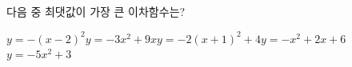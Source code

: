 \hspace*{2mm}\begin{minipage}[t]{\dimexpr\linewidth-2mm\relax}\vspace{0pt}
다음 중 최댓값이 가장 큰 이차함수는?
\begin{choicesii}{$y=-(x-2)^2$}{$y=-3x^2+9x$}{$y=-2(x+1)^2+4$}{$y=-x^2+2x+6$}{$y=-5x^2+3$}\end{choicesii}\end{minipage}
